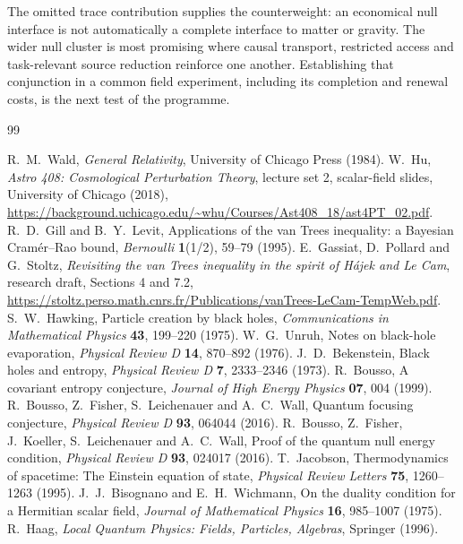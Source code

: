 \documentclass[12pt,a4paper]{article}
\theoremstyle{definition}
\begin{document}
The omitted trace contribution supplies the counterweight: an economical
null interface is not automatically a complete interface to matter or
gravity. The wider null cluster is most promising where causal transport,
restricted access and task-relevant source reduction reinforce one
another. Establishing that conjunction in a common field experiment,
including its completion and renewal costs, is the next test of the
programme.

\begin{thebibliography}{99}
\raggedright
{} R.~M.~Wald, \emph{General Relativity}, University of Chicago Press (1984).
 W.~Hu, \emph{Astro 408: Cosmological Perturbation Theory}, lecture set 2, scalar-field slides, University of Chicago (2018),
\url{https://background.uchicago.edu/~whu/Courses/Ast408_18/ast4PT_02.pdf}.
 R.~D.~Gill and B.~Y.~Levit, Applications of the van Trees inequality: a Bayesian Cram\'er--Rao bound,
\emph{Bernoulli} \textbf{1}(1/2), 59--79 (1995).
 E.~Gassiat, D.~Pollard and G.~Stoltz,
\emph{Revisiting the van Trees inequality in the spirit of H\'ajek and Le Cam}, research draft, Sections 4 and 7.2,
\url{https://stoltz.perso.math.cnrs.fr/Publications/vanTrees-LeCam-TempWeb.pdf}.
 S.~W.~Hawking, Particle creation by black holes,
\emph{Communications in Mathematical Physics} \textbf{43}, 199--220 (1975).
 W.~G.~Unruh, Notes on black-hole evaporation,
\emph{Physical Review D} \textbf{14}, 870--892 (1976).
 J.~D.~Bekenstein, Black holes and entropy,
\emph{Physical Review D} \textbf{7}, 2333--2346 (1973).
 R.~Bousso, A covariant entropy conjecture,
\emph{Journal of High Energy Physics} \textbf{07}, 004 (1999).
 R.~Bousso, Z.~Fisher, S.~Leichenauer and A.~C.~Wall,
Quantum focusing conjecture, \emph{Physical Review D} \textbf{93}, 064044 (2016).
 R.~Bousso, Z.~Fisher, J.~Koeller, S.~Leichenauer and A.~C.~Wall,
Proof of the quantum null energy condition, \emph{Physical Review D} \textbf{93}, 024017 (2016).
 T.~Jacobson, Thermodynamics of spacetime: The Einstein equation of state,
\emph{Physical Review Letters} \textbf{75}, 1260--1263 (1995).
 J.~J.~Bisognano and E.~H.~Wichmann,
On the duality condition for a Hermitian scalar field,
\emph{Journal of Mathematical Physics} \textbf{16}, 985--1007 (1975).
 R.~Haag, \emph{Local Quantum Physics: Fields, Particles, Algebras}, Springer (1996).

\end{thebibliography}
\end{document}
